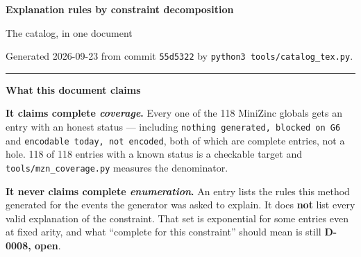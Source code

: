 \documentclass[10pt,a4paper]{article}
\begin{document}
\begin{titlepage}
\vspace*{2cm}
{\Huge\bfseries Explanation rules by constraint decomposition\par}
\vspace{0.6em}
{\LARGE The catalog, in one document\par}
\vspace{1.4em}
{\large Generated 2026-09-23 from commit \texttt{55d5322} by \texttt{python3 tools/catalog\_tex.py}.\par}
\vspace{1.6em}
\hrule
\vspace{1.2em}
{\large\bfseries What this document claims\par}
\textbf{It claims complete \emph{coverage}.} Every one of the 118 MiniZinc globals gets an entry with an honest status --- including \texttt{nothing generated, blocked on G6} and \texttt{encodable today, not encoded}, both of which are complete entries, not a hole. 118 of 118 entries with a known status is a checkable target and \texttt{tools/mzn\_coverage.py} measures the denominator.

\textbf{It never claims complete \emph{enumeration}.} An entry lists the rules this method generated for the events the generator was asked to explain. It does \textbf{not} list every valid explanation of the constraint. That set is exponential for some entries even at fixed arity, and what ``complete for this constraint'' should mean is still \textbf{D-0008, open}.


\end{titlepage}
\end{document}
